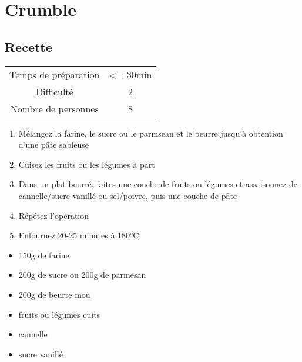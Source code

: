 \newpage
\section{Crumble}
    \label{sec:Crumble}
    \subsection{Recette}
    \vspace{1cm}


    \begin{center}
        \begin{tabular}{c|c}
            Temps de préparation & <= 30min \\
            Difficulté & 2 \\
            Nombre de personnes & 8 
        \end{tabular}
    \end{center}{}

    \vspace{1cm}
    \hline
    \vspace{1cm}

    \begin{minipage}{.7\textwidth}
        \begin{enumerate}
            \item Mélangez la farine, le sucre ou le parmsean et le beurre jusqu'à obtention d'une pâte sableuse
	    \item Cuisez les fruits ou les légumes à part
	    \item Dans un plat beurré, faites une couche de fruits ou légumes et assaisonnez de cannelle/sucre vanillé ou sel/poivre, puis une couche de pâte
	    \item Répétez l'opération
	    \item Enfournez 20-25 minutes à 180°C.

        \end{enumerate}
    \end{minipage}
    \begin{minipage}{.3\textwidth}
        \begin{flushleft}
        \begin{itemize}
            \item 150g de farine
	    \item 200g de sucre ou 200g de parmesan
	    \item 200g de beurre mou
	    \item fruits ou légumes cuits
	    \item cannelle
	    \item sucre vanillé

        \end{itemize}
        \end{flushleft}
    \end{minipage}
    
